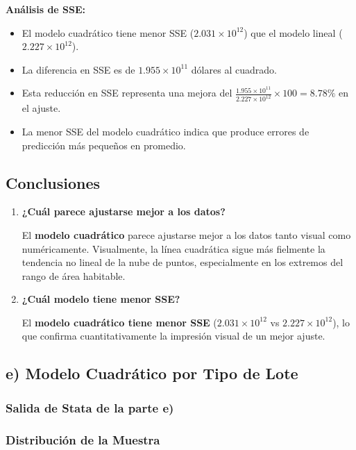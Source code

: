 \documentclass[12pt]{article}
\begin{document}
\textbf{Análisis de SSE:}
\begin{itemize}
    \item El modelo cuadrático tiene menor SSE ($2.031 \times 10^{12}$) que el modelo lineal ($2.227 \times 10^{12}$).
    \item La diferencia en SSE es de $1.955 \times 10^{11}$ dólares al cuadrado.
    \item Esta reducción en SSE representa una mejora del $\frac{1.955 \times 10^{11}}{2.227 \times 10^{12}} \times 100 = 8.78\%$ en el ajuste.
    \item La menor SSE del modelo cuadrático indica que produce errores de predicción más pequeños en promedio.
\end{itemize}

\subsection*{Conclusiones}

\begin{enumerate}
    \item \textbf{¿Cuál parece ajustarse mejor a los datos?}
    
    El \textbf{modelo cuadrático} parece ajustarse mejor a los datos tanto visual como numéricamente. Visualmente, la línea cuadrática sigue más fielmente la tendencia no lineal de la nube de puntos, especialmente en los extremos del rango de área habitable.
    
    \item \textbf{¿Cuál modelo tiene menor SSE?}
    
    El \textbf{modelo cuadrático tiene menor SSE} ($2.031 \times 10^{12}$ vs $2.227 \times 10^{12}$), lo que confirma cuantitativamente la impresión visual de un mejor ajuste.
    
\end{enumerate}

\subsection*{e) Modelo Cuadrático por Tipo de Lote}

\subsubsection*{Salida de Stata de la parte e)}

\subsubsection*{Distribución de la Muestra}
\end{document}
